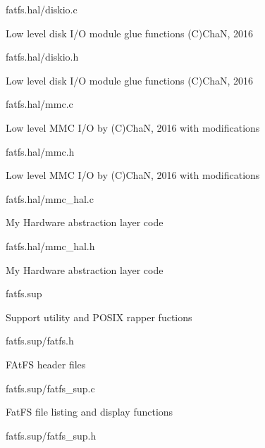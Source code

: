 \begin{DoxyItemize}
\begin{DoxyItemize}
\item fatfs.\+hal/diskio.c
\begin{DoxyItemize}
\item Low level disk I/O module glue functions (C)ChaN, 2016
\end{DoxyItemize}
\item fatfs.\+hal/diskio.h
\begin{DoxyItemize}
\item Low level disk I/O module glue functions (C)ChaN, 2016
\end{DoxyItemize}
\item fatfs.\+hal/mmc.c
\begin{DoxyItemize}
\item Low level M\+MC I/O by (C)ChaN, 2016 with modifications
\end{DoxyItemize}
\item fatfs.\+hal/mmc.h
\begin{DoxyItemize}
\item Low level M\+MC I/O by (C)ChaN, 2016 with modifications
\end{DoxyItemize}
\item fatfs.\+hal/mmc\+\_\+hal.c
\begin{DoxyItemize}
\item My Hardware abstraction layer code
\end{DoxyItemize}
\item fatfs.\+hal/mmc\+\_\+hal.h
\begin{DoxyItemize}
\item My Hardware abstraction layer code
\end{DoxyItemize}
\end{DoxyItemize}
\item fatfs.\+sup
\begin{DoxyItemize}
\item Support utility and P\+O\+S\+IX rapper fuctions
\item fatfs.\+sup/fatfs.h
\begin{DoxyItemize}
\item F\+At\+FS header files
\end{DoxyItemize}
\item fatfs.\+sup/fatfs\+\_\+sup.c
\begin{DoxyItemize}
\item Fat\+FS file listing and display functions
\end{DoxyItemize}
\item fatfs.\+sup/fatfs\+\_\+sup.h
\begin{DoxyItemize}

\end{DoxyItemize}
\end{DoxyItemize}
\end{DoxyItemize}

